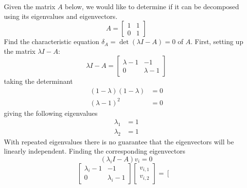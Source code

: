 \begin{example}
  Given the matrix $A$ below, we would like to determine if it can be decomposed using its eigenvalues and eigenvectors.
  \begin{equation*}
    A=
    \left[
      \begin{array}{cc}
        1 & 1 \\ 0 & 1
      \end{array}
    \right]
  \end{equation*}
  Find the characteristic equation $\delta_{A}=\det(\lambda I-A)=0$ of $A$.
  First, setting up the matrix $\lambda I-A$:
  \begin{equation*}
    \lambda I-A=
    \left[
      \begin{array}{cc}
        \lambda-1 & -1 \\ 0 & \lambda-1
      \end{array}
    \right]
  \end{equation*}
  taking the determinant
  \begin{equation*}
    \begin{split}
      (1-\lambda)(1-\lambda)&=0 \\
      (\lambda-1)^{2}&=0
    \end{split}
  \end{equation*}
  giving the following eigenvalues
  \begin{equation*}
    \begin{split}
      \lambda_{1}&=1 \\
      \lambda_{2}&=1
    \end{split}
  \end{equation*}
  With repeated eigenvalues there is no guarantee that the eigenvectors will be linearly independent.
  Finding the corresponding eigenvectors
  \begin{equation*}
    (\lambda_{i} I-A)v_{i}=0
  \end{equation*}
  \begin{equation*}
    \left[
      \begin{array}{cc}
        \lambda_{i}-1 & -1 \\ 0 & \lambda_{i}-1
      \end{array}
    \right]
    \left[
      \begin{array}{c}
        v_{i,1} \\ v_{i,2}
      \end{array}
    \right]
    =
    \left[
    \begin{array}{c}

\end{array}
\end{equation*}
\end{example}
